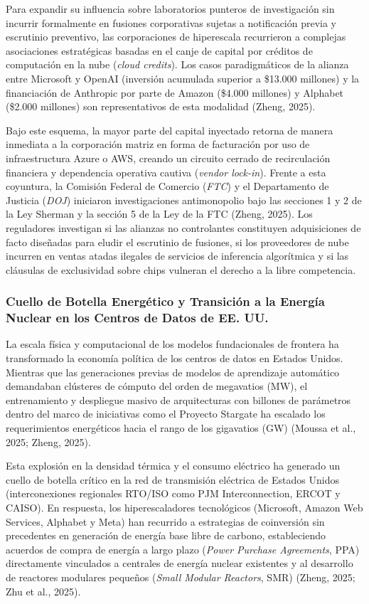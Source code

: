 Para expandir su influencia sobre laboratorios punteros de investigación sin incurrir formalmente en fusiones corporativas sujetas a notificación previa y escrutinio preventivo, las corporaciones de hiperescala recurrieron a complejas asociaciones estratégicas basadas en el canje de capital por créditos de computación en la nube (\textit{cloud credits}). Los casos paradigmáticos de la alianza entre Microsoft y OpenAI (inversión acumulada superior a \$13.000 millones) y la financiación de Anthropic por parte de Amazon (\$4.000 millones) y Alphabet (\$2.000 millones) son representativos de esta modalidad (Zheng, 2025). 

Bajo este esquema, la mayor parte del capital inyectado retorna de manera inmediata a la corporación matriz en forma de facturación por uso de infraestructura Azure o AWS, creando un circuito cerrado de recirculación financiera y dependencia operativa cautiva (\textit{vendor lock-in}). Frente a esta coyuntura, la Comisión Federal de Comercio (\textit{FTC}) y el Departamento de Justicia (\textit{DOJ}) iniciaron investigaciones antimonopolio bajo las secciones 1 y 2 de la Ley Sherman y la sección 5 de la Ley de la FTC (Zheng, 2025). Los reguladores investigan si las alianzas no controlantes constituyen adquisiciones de facto diseñadas para eludir el escrutinio de fusiones, si los proveedores de nube incurren en ventas atadas ilegales de servicios de inferencia algorítmica y si las cláusulas de exclusividad sobre chips vulneran el derecho a la libre competencia.


\subsubsection{Cuello de Botella Energético y Transición a la Energía Nuclear en los Centros de Datos de EE. UU.}

La escala física y computacional de los modelos fundacionales de frontera ha transformado la economía política de los centros de datos en Estados Unidos. Mientras que las generaciones previas de modelos de aprendizaje automático demandaban clústeres de cómputo del orden de megavatios (MW), el entrenamiento y despliegue masivo de arquitecturas con billones de parámetros dentro del marco de iniciativas como el Proyecto Stargate ha escalado los requerimientos energéticos hacia el rango de los gigavatios (GW) (Moussa et al., 2025; Zheng, 2025).

Esta explosión en la densidad térmica y el consumo eléctrico ha generado un cuello de botella crítico en la red de transmisión eléctrica de Estados Unidos (interconexiones regionales RTO/ISO como PJM Interconnection, ERCOT y CAISO). En respuesta, los hiperescaladores tecnológicos (Microsoft, Amazon Web Services, Alphabet y Meta) han recurrido a estrategias de coinversión sin precedentes en generación de energía base libre de carbono, estableciendo acuerdos de compra de energía a largo plazo (\textit{Power Purchase Agreements}, PPA) directamente vinculados a centrales de energía nuclear existentes y al desarrollo de reactores modulares pequeños (\textit{Small Modular Reactors}, SMR) (Zheng, 2025; Zhu et al., 2025).


